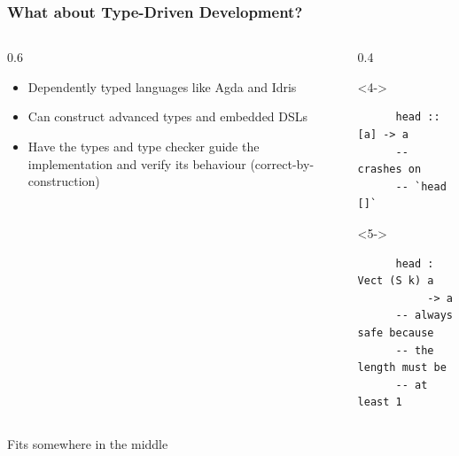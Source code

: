 \documentclass[compress]{beamer}
\begin{document}
\begin{frame}[fragile]
\begin{tikzpicture}[> = stealth, semithick]
  \end{tikzpicture}

\end{frame}


\begin{frame}[fragile]
  \frametitle{What about Type-Driven Development?}

  \large

  \begin{columns}
  \begin{column}{0.6\framewidth}
    \begin{itemize}
      \item<1-> Dependently typed languages like Agda and Idris
      \item<2-> Can construct advanced types and embedded DSLs
      \item<3-> Have the types and type checker guide the implementation and
                verify its behaviour (correct-by-construction)
    \end{itemize}
  \end{column}
  \begin{column}{0.4\framewidth}
    \begin{onlyenv}<4->
    \begin{verbatim}
      head :: [a] -> a
      -- crashes on
      -- `head []`
    \end{verbatim}
    \end{onlyenv}

    \vspace*{3mm}

    \begin{onlyenv}<5->
    \begin{verbatim}
      head :  Vect (S k) a
           -> a
      -- always safe because
      -- the length must be
      -- at least 1
    \end{verbatim}
    \end{onlyenv}
  \end{column}
  \end{columns}

  \pause

  \vspace*{2mm}
  \begin{center}
    \large
    Fits somewhere in the middle
  \end{center}
  \vspace*{-12mm}
\end{frame}
\end{document}

